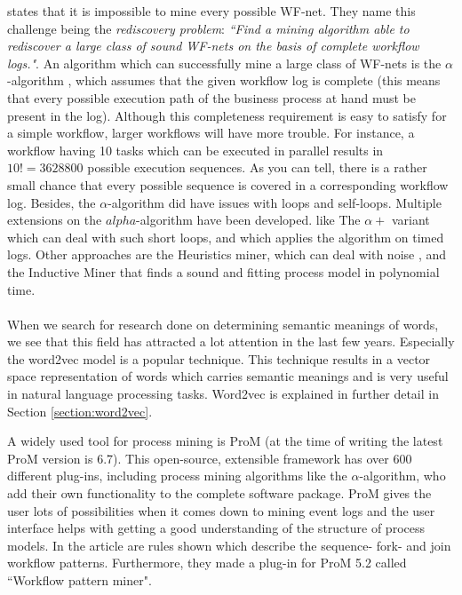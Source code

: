 \documentclass[a4paper,11pt]{article}
\begin{document}
\cite{VanDerAalst2002} states that it is impossible to mine every possible WF-net. They name this challenge being the \textit{rediscovery problem}: \textit{``Find a mining algorithm able to rediscover a large class of sound WF-nets on the basis of complete workflow logs."}\cite{VanDerAalst2002}. An algorithm which can successfully mine a large class of WF-nets is the $\alpha$-algorithm \cite{VanderAalst2003,VanDerAalst2002,VanderAalst2002TimedLogs}, which assumes that the given workflow log is complete (this means that every possible execution path of the business process at hand must be present in the log). Although this completeness requirement is easy to satisfy for a simple workflow, larger workflows will have more trouble. For instance, a workflow having 10 tasks which can be executed in parallel results in $10!=3628800$ possible execution sequences. As you can tell, there is a rather small chance that every possible sequence is covered in a corresponding workflow log. Besides, the $\alpha$-algorithm did have issues with loops and self-loops. Multiple extensions on the $alpha$-algorithm have been developed. like The $\alpha+$ variant \cite{A+-algorithm2004} which can deal with such short loops, and \cite{VanderAalst2002TimedLogs} which applies the algorithm on timed logs. Other approaches are the Heuristics miner, which can deal with noise \cite{HeuristicsMiner2006}, and the Inductive Miner \cite{InductiveMiner2013} that finds a sound and fitting process model in polynomial time.\\
\\


When we search for research done on determining semantic meanings of words, we see that this field has attracted a lot attention in the last few years. Especially the word2vec model \cite{Mikolov2013a,Mikolov2013b} is a popular technique. This technique results in a vector space representation of words which carries semantic meanings and is very useful in natural language processing tasks. Word2vec is explained in further detail in Section \ref{section:word2vec}.

A widely used tool for process mining is ProM \cite{ProM6} (at the time of writing the latest ProM version is 6.7). This open-source, extensible framework has over 600 different plug-ins, including process mining algorithms like the $\alpha$-algorithm, who add their own functionality to the complete software package. ProM gives the user lots of possibilities when it comes down to mining event logs and the user interface helps with getting a good understanding of the structure of process models. In the article \cite{WorkflowMiner2006} are rules shown which describe the sequence- fork- and join workflow patterns. Furthermore, they made a plug-in for ProM 5.2 called ``Workflow pattern miner". 
\end{document}
